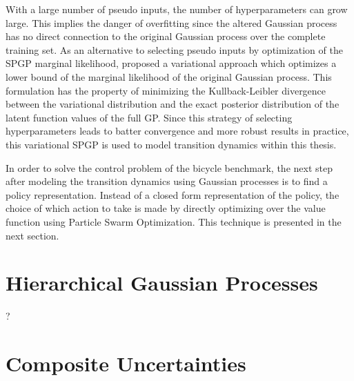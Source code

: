 With a large number of pseudo inputs, the number of hyperparameters can grow large.
This implies the danger of overfitting since the altered Gaussian process has no direct connection to the original Gaussian process over the complete training set.
As an alternative to selecting pseudo inputs by optimization of the SPGP marginal likelihood, \citeauthor{titsias_variational_2009} proposed a variational approach \cite{titsias_variational_2009} which optimizes a lower bound of the marginal likelihood of the original Gaussian process.
This formulation has the property of minimizing the Kullback-Leibler divergence between the variational distribution and the exact posterior distribution of the latent function values of the full GP.
Since this strategy of selecting hyperparameters leads to batter convergence and more robust results in practice, this variational SPGP is used to model transition dynamics within this thesis.

In order to solve the control problem of the bicycle benchmark, the next step after modeling the transition dynamics using Gaussian processes is to find a policy representation.
Instead of a closed form representation of the policy, the choice of which action to take is made by directly optimizing over the value function using Particle Swarm Optimization.
This technique is presented in the next section.


\section{Hierarchical Gaussian Processes}
\label{sec:hierarchical_gaussian_processes}
?


\section{Composite Uncertainties}
\label{sec:composite_uncertainties}


